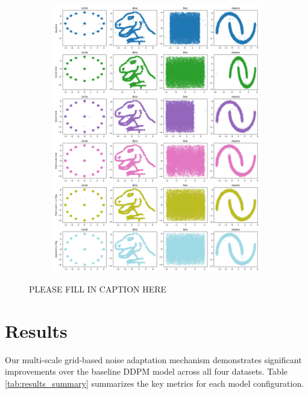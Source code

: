 \documentclass{article} %
\begin{document}
\begin{figure}[t]
    \centering
    \begin{subfigure}{0.9\textwidth}
        \includegraphics[width=\textwidth]{generated_images.png}
        \label{fig:diffusion-samples}
    \end{subfigure}
    \caption{PLEASE FILL IN CAPTION HERE}
    \label{fig:first_figure}
\end{figure}

\section{Results}
\label{sec:results}

Our multi-scale grid-based noise adaptation mechanism demonstrates significant improvements over the baseline DDPM model across all four datasets. Table \ref{tab:results_summary} summarizes the key metrics for each model configuration.
\end{document}
